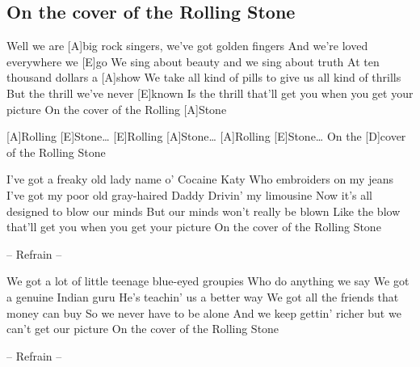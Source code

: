 \subsection*{On the cover of the Rolling Stone   }

\begin{guitar}

Well we are [A]big rock singers, we've got golden fingers
And we're loved everywhere we [E]go
We sing about beauty and we sing about truth
At ten thousand dollars a [A]show
We take all kind of pills to give us all kind of thrills
But the thrill we've never [E]known
Is the thrill that'll get you when you get your picture
On the cover of the Rolling [A]Stone



[A]Rolling [E]Stone\ldots  {}
[E]Rolling [A]Stone\ldots  {}
[A]Rolling [E]Stone\ldots  {}
On the [D]cover of the Rolling Stone


I've got a freaky old lady name o' Cocaine Katy
Who embroiders on my jeans
I've got my poor old gray-haired Daddy
Drivin' my limousine
Now it's all designed to blow our minds
But our minds won't really be blown
Like the blow that'll get you when you get your picture
On the cover of the Rolling Stone

-- Refrain --

We got a lot of little teenage blue-eyed groupies
Who do anything we say
We got a genuine Indian guru
He's teachin' us a better way
We got all the friends that money can buy
So we never have to be alone
And we keep gettin' richer but we can't get our picture
On the cover of the Rolling Stone

-- Refrain --

\end{guitar}
